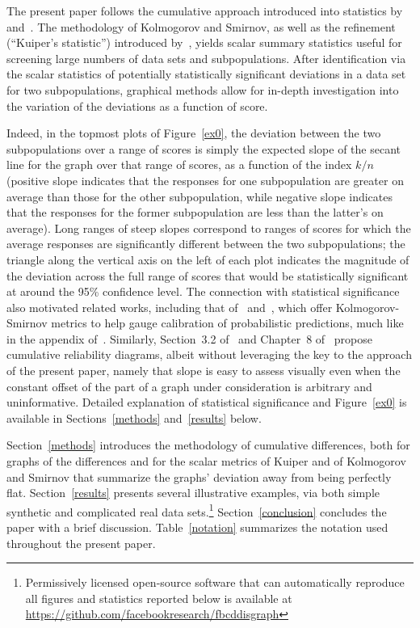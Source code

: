 \documentclass{article}
\begin{document}
The present paper follows the cumulative approach introduced into statistics
by~\cite{kolmogorov} and~\cite{smirnov}.
The methodology of Kolmogorov and Smirnov,
as well as the refinement (``Kuiper's statistic'') introduced by~\cite{kuiper},
yields scalar summary statistics useful for screening large numbers
of data sets and subpopulations. After identification via the scalar statistics
of potentially statistically significant deviations in a data set
for two subpopulations, graphical methods allow for in-depth investigation
into the variation of the deviations as a function of score.

Indeed, in the topmost plots of Figure~\ref{ex0},
the deviation between the two subpopulations over a range of scores
is simply the expected slope of the secant line for the graph
over that range of scores, as a function of the index $k/n$
(positive slope indicates that the responses
for one subpopulation are greater on average than those
for the other subpopulation, while negative slope indicates
that the responses for the former subpopulation are less than the latter's
on average).
Long ranges of steep slopes correspond to ranges of scores for which
the average responses are significantly different
between the two subpopulations;
the triangle along the vertical axis on the left of each plot
indicates the magnitude of the deviation across the full range of scores
that would be statistically significant at around the 95\% confidence level.
The connection with statistical significance also motivated related works,
including that of~\cite{gupta-rahimi-ajanthan-mensink-sminchisescu-hartley}
and~\cite{roelofs-cain-shlens-mozer}, which offer Kolmogorov-Smirnov metrics
to help gauge calibration of probabilistic predictions,
much like in the appendix of~\cite{tygert}.
Similarly, Section~3.2 of~\cite{gneiting-balabdaoui-raftery} and
Chapter~8 of~\cite{wilks} propose cumulative reliability diagrams,
albeit without leveraging the key to the approach of the present paper,
namely that slope is easy to assess visually even when the constant offset
of the part of a graph under consideration is arbitrary and uninformative.
Detailed explanation of statistical significance and Figure~\ref{ex0}
is available in Sections~\ref{methods} and~\ref{results} below.

Section~\ref{methods} introduces the methodology of cumulative differences,
both for graphs of the differences and for the scalar metrics
of Kuiper and of Kolmogorov and Smirnov that summarize the graphs' deviation
away from being perfectly flat.
Section~\ref{results} presents several illustrative examples,
via both simple synthetic and complicated real data sets.\footnote{Permissively
licensed open-source software that can automatically reproduce all figures
and statistics reported below is available at
\url{https://github.com/facebookresearch/fbcddisgraph}}
Section~\ref{conclusion} concludes the paper with a brief discussion.
Table~\ref{notation} summarizes the notation used throughout the present paper.
\end{document}
